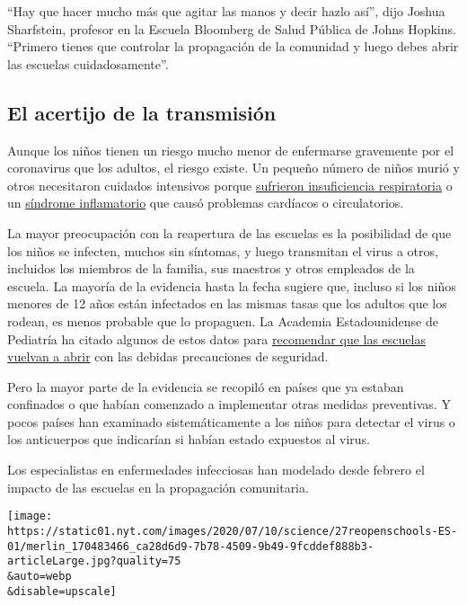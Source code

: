 ``Hay que hacer mucho más que agitar las manos y decir hazlo así'', dijo
Joshua Sharfstein, profesor en la Escuela Bloomberg de Salud Pública de
Johns Hopkins. ``Primero tienes que controlar la propagación de la
comunidad y luego debes abrir las escuelas cuidadosamente''.

\hypertarget{el-acertijo-de-la-transmisiuxf3n}{%
\subsection{El acertijo de la
transmisión}\label{el-acertijo-de-la-transmisiuxf3n}}

Aunque los niños tienen un riesgo mucho menor de enfermarse gravemente
por el coronavirus que los adultos, el riesgo existe. Un pequeño número
de niños murió y otros necesitaron cuidados intensivos porque
\href{https://www.nytimes.com/2020/04/06/health/coronavirus-children-us.html}{sufrieron
insuficiencia respiratoria} o un
\href{https://www.nytimes.com/es/2020/05/18/espanol/sindrome-coronavirus-ninos.html}{síndrome
inflamatorio} que causó problemas cardíacos o circulatorios.

La mayor preocupación con la reapertura de las escuelas es la
posibilidad de que los niños se infecten, muchos sin síntomas, y luego
transmitan el virus a otros, incluidos los miembros de la familia, sus
maestros y otros empleados de la escuela. La mayoría de la evidencia
hasta la fecha sugiere que, incluso si los niños menores de 12 años
están infectados en las mismas tasas que los adultos que los rodean, es
menos probable que lo propaguen. La Academia Estadounidense de Pediatría
ha citado algunos de estos datos para
\href{https://services.aap.org/en/pages/2019-novel-coronavirus-covid-19-infections/clinical-guidance/covid-19-planning-considerations-return-to-in-person-education-in-schools/}{recomendar
que las escuelas vuelvan a abrir} con las debidas precauciones de
seguridad.

Pero la mayor parte de la evidencia se recopiló en países que ya estaban
confinados o que habían comenzado a implementar otras medidas
preventivas. Y pocos países han examinado sistemáticamente a los niños
para detectar el virus o los anticuerpos que indicarían si habían estado
expuestos al virus.

Los especialistas en enfermedades infecciosas han modelado desde febrero
el impacto de las escuelas en la propagación comunitaria.

\texttt{[image: https://static01.nyt.com/images/2020/07/10/science/27reopenschools-ES-01/merlin\_170483466\_ca28d6d9-7b78-4509-9b49-9fcddef888b3-articleLarge.jpg?quality=75\\\&auto=webp\\\&disable=upscale]}


